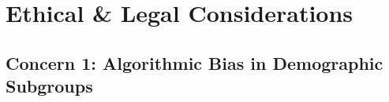 \documentclass[11pt,a4paper]{article}
\begin{document}

\section{Ethical \& Legal Considerations}
\label{sec:ethics}


\subsection{Concern 1: Algorithmic Bias in Demographic Subgroups}
\label{subsec:bias}

\end{document}
